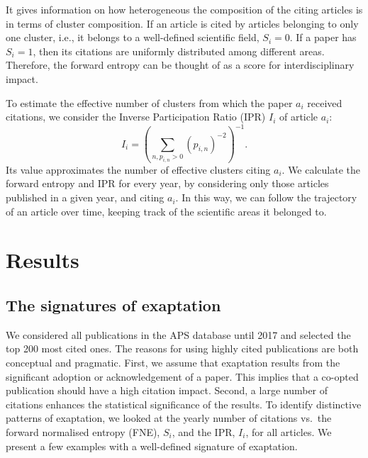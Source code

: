 \documentclass[draft,final]{vutinfth} %
\begin{document}
It gives information on how heterogeneous the composition of the citing articles is in terms of cluster composition. If an article is cited by articles belonging to only one cluster, i.e., it belongs to a well-defined scientific field, $S_i=0$. If a paper has $S_i=1$, then its citations are uniformly distributed among different areas. Therefore, the forward entropy can be thought of as a score for interdisciplinary impact.

To estimate the effective number of clusters from which the paper $a_i$ received citations, we consider the Inverse Participation Ratio (IPR) $I_i$ of article $a_i$: 
\begin{equation}
    I_i = \left(\sum_{n, p_{i,n}>0} (p_{i,n})^{-2}\right)^{-1}.
    \label{eq:ipr}
\end{equation}
Its value approximates the number of effective clusters citing $a_i$. We calculate the forward entropy and IPR for every year, by considering only those articles published in a given year, and citing $a_i$. In this way, we can follow the trajectory of an article over time, keeping track of the scientific areas it belonged to.

\section{Results}
\subsection{The signatures of exaptation}

We considered all publications in the APS database until 2017 and selected the top 200 most cited ones. 
The reasons for using highly cited publications are both conceptual and pragmatic. 
First, we assume that exaptation results from the significant adoption or acknowledgement of a paper. 
This implies that a co-opted publication should have a high citation impact. 
Second, a large number of citations enhances the statistical significance of the results. 
To identify distinctive patterns of exaptation, we looked at the yearly number of citations vs.\ the forward normalised entropy (FNE), $S_i$, and the IPR, $I_i$, for all articles. We present a few examples with a well-defined signature of exaptation. 
\end{document}
